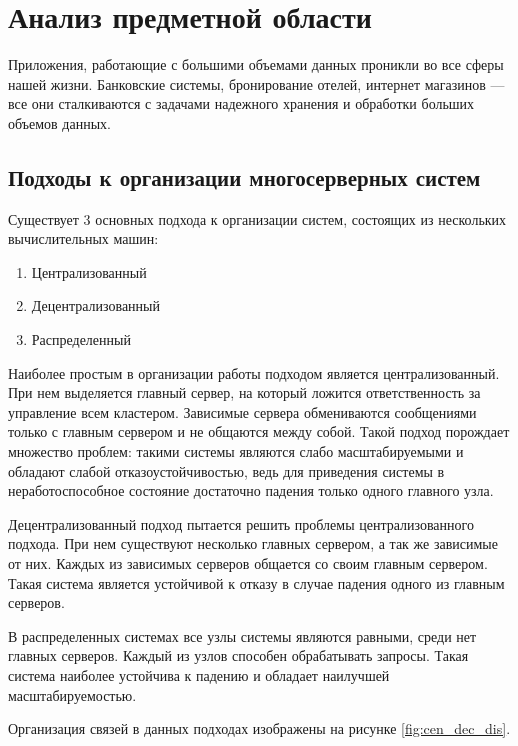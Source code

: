 \chapter{Анализ предметной области}

    Приложения, работающие с большими объемами данных проникли во все сферы нашей жизни. Банковские системы, бронирование отелей, интернет магазинов --- все они сталкиваются с задачами надежного хранения и обработки больших объемов данных.
    
    \section{Подходы к организации многосерверных систем}
    
        Существует 3 основных подхода к организации систем, состоящих из нескольких вычислительных машин\cite{burger2019distributed}:
        
        \begin{enumerate}
            \item Централизованный
            \item Децентрализованный
            \item Распределенный
        \end{enumerate}
        
        Наиболее простым в организации работы подходом является централизованный. При нем выделяется главный сервер, на который ложится ответственность за управление всем кластером. Зависимые сервера обмениваются сообщениями только с главным сервером и не общаются между собой. Такой подход порождает множество проблем: такими системы являются слабо масштабируемыми и обладают слабой отказоустойчивостью, ведь для приведения системы в неработоспособное состояние достаточно падения только одного главного узла.
        
        Децентрализованный подход пытается решить проблемы централизованного подхода. При нем существуют несколько главных сервером, а так же зависимые от них. Каждых из зависимых серверов общается со своим главным сервером. Такая система является устойчивой к отказу в случае падения одного из главным серверов.
        
        В распределенных системах все узлы системы являются равными, среди нет главных серверов. Каждый из узлов способен обрабатывать запросы. Такая система наиболее устойчива к падению и обладает наилучшей масштабируемостью.
        
        Организация связей в данных подходах изображены на рисунке \ref{fig:cen_dec_dis}.
        
